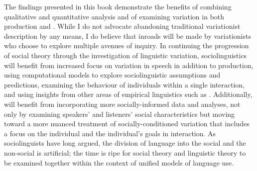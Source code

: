 The findings presented in this book demonstrate the benefits of combining qualitative and quantitative analysis and of examining variation in both production and .  While I do not advocate abandoning traditional variationist description by any means, I do believe that inroads will be made by variationists who choose to explore multiple avenues of inquiry.  In continuing the progression of social theory through the investigation of linguistic variation, sociolinguistics will benefit from increased focus on variation in speech  in addition to production, using computational models to explore sociolinguistic assumptions and predictions, examining the behaviour of individuals within a single interaction, and using insights from other areas of empirical linguistics such as .  Additionally,  will benefit from incorporating more socially-informed data and analyses, not only by examining speakers' and listeners' social characteristics but moving toward a more nuanced treatment of socially-conditioned variation that includes a focus on the individual and the individual's goals in interaction. As sociolinguists have long argued, the division of language into the social and the non-social is artificial; the time is ripe for social theory and linguistic theory to be examined together within the context of unified models of language use.